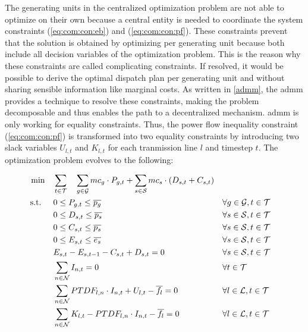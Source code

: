 The generating units in the centralized optimization problem are not able to optimize on their own because a central entity is needed to coordinate the system constraints (\ref{eq:com:con:eb}) and (\ref{eq:com:con:pf}). These constraints prevent that the solution is obtained by optimizing per generating unit because both include all decision variables of the optimization problem. This is the reason why these constraints are called complicating constraints. If resolved, it would be possible to derive the optimal dispatch plan per generating unit and without sharing sensible information like marginal costs. As written in \ref{admm}, the \gls{admm} provides a technique to resolve these constraints, making the problem decomposable and thus enables the path to a decentralized mechanism. \gls{admm} is only working for equality constraints. Thus, the power flow inequality constraint (\ref{eq:com:con:pf}) is transformed into two equality constraints by introducing two slack variables $U_{l,t}$ and $K_{l,t}$ for each tranmission line $l$ and timestep $t$. The optimization problem evolves to the following:

\begin{subequations}
	\begin{align}
		 \min \quad & \sum_{t\in\mathcal{T}} \quad \sum_{g\in\mathcal{G}}mc_g \cdot P_{g,t} + \sum_{s\in\mathcal{S}}mc_s \cdot (D_{s,t}+C_{s,t}) \label{eq:dom:relaxed-constraints}\\
		 \text{s.t. } \quad & 0 \leq P_{g,t} \leq \overline{p_g} && \forall g \in \mathcal{G}, t \in \mathcal{T}\\
		 & 0 \leq D_{s,t} \leq \overline{p_s} && \forall s \in \mathcal{S}, t \in \mathcal{T} \\
		 & 0 \leq C_{s,t} \leq \overline{p_s} && \forall s \in \mathcal{S}, t \in \mathcal{T} \\
		 & 0 \leq E_{s,t} \leq \overline{e_s} && \forall s \in \mathcal{S}, t \in \mathcal{T} \\
		 & E_{s,t} - E_{s,t-1} - C_{s,t} + D_{s,t} = 0 && \forall s \in \mathcal{S}, t \in \mathcal{T}\\
		 & \sum_{n \in \mathcal{N}} I_{n,t} = 0 && \forall t \in \mathcal{T} \\
		 & \sum_{n \in \mathcal{N}} PTDF_{l,n} \cdot I_{n,t} + U_{l,t} - \overline{f_l} = 0 && \forall l \in \mathcal{L}, t \in \mathcal{T} \label{eq:dom:con:pf-upper} \\
		 & \sum_{n \in \mathcal{N}} K_{l,t} - PTDF_{l,n} \cdot I_{n,t} - \overline{f_l} = 0 && \forall l \in \mathcal{L}, t \in \mathcal{T} \label{eq:dom:con:pf-lower}
	\end{align}
\end{subequations}

